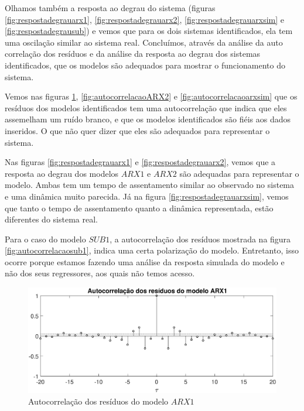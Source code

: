 Olhamos também a resposta ao degrau do sistema (figuras \ref{fig:respostadegrauarx1}, \ref{fig:respostadegrauarx2}, \ref{fig:respostadegrauarxsim} e  \ref{fig:respostadegrausub}) e vemos que para os dois sistemas identificados, ela tem uma oscilação similar ao sistema real. Concluímos, através da análise da auto correlação dos resíduos e da análise da resposta ao degrau dos sistemas identificados, que os modelos são adequados para mostrar o funcionamento do sistema.

Vemos nas figuras \ref{fig:autocorrelacaoARX1}, \ref{fig:autocorrelacaoARX2} e \ref{fig:autocorrelacaoarxsim} que os resíduos dos modelos identificados tem uma autocorrelação que indica que eles assemelham um ruído branco, e que os modelos identificados são fiéis aos dados inseridos. O que não quer dizer que eles são adequados para representar o sistema.


Nas figuras \ref{fig:respostadegrauarx1} e \ref{fig:respostadegrauarx2}, vemos que a resposta ao degrau dos modelos $ARX1$ e $ARX2$ são adequadas para representar o modelo. Ambas tem um tempo de assentamento similar ao observado no sistema e uma dinâmica muito parecida. Já na figura \ref{fig:respostadegrauarxsim}, vemos que tanto o tempo de assentamento quanto a dinâmica representada, estão diferentes do sistema real.


Para o caso do modelo $SUB1$, a autocorrelação dos resíduos mostrada na figura \ref{fig:autocorrelacaosub1}, indica uma certa polarização do modelo. Entretanto, isso ocorre porque estamos fazendo uma análise da resposta simulada do modelo e não dos seus regressores, aos quais não temos acesso.

\begin{figure}[htb]
	\centering
	\includegraphics[width=1\linewidth]{autocorrelacaoARX1}
	\caption[Autocorrelação dos resíduos do modelo $ARX1$]{Autocorrelação dos resíduos do modelo $ARX1$}
	\label{fig:autocorrelacaoARX1}
\end{figure}

